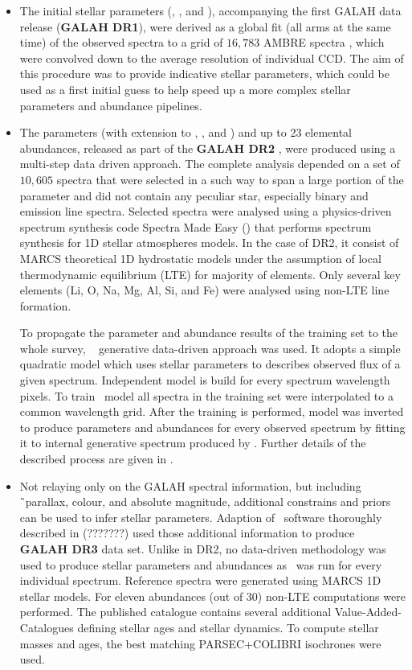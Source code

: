 \begin{itemize}
	\item The initial stellar parameters (\Teff, \Logg, and \Feh), accompanying the first GALAH data release (\textbf{GALAH DR1}), were derived as a global fit (all arms at the same time) of the observed spectra to a grid of $16,783$ AMBRE spectra \citep{2012A&A...544A.126D}, which were convolved down to the average resolution of individual CCD. The aim of this procedure was to provide indicative stellar parameters, which could be used as a first initial guess to help speed up a more complex stellar parameters and abundance pipelines.
	
	\item The parameters (with extension to \vsin, \vmic, and \aks) and up to 23 elemental abundances, released as part of the \textbf{GALAH DR2} \citep{buder2018}, were produced using a multi-step data driven approach. The complete analysis depended on a set of $10,605$ spectra that were selected in a such way to span a large portion of the parameter and did not contain any peculiar star, especially binary and emission line spectra. Selected spectra were analysed using a physics-driven spectrum synthesis code Spectra Made Easy (\SM) \citep{1996A&AS..118..595V, 2017A&A...597A..16P} that performs spectrum synthesis for 1D stellar atmospheres models. In the case of DR2, it consist of MARCS theoretical 1D hydrostatic models \citep{2008A&A...486..951G} under the assumption of local thermodynamic equilibrium (LTE) for majority of elements. Only several key elements (Li, O, Na, Mg, Al, Si, and Fe) were analysed using non-LTE line formation.
	
	To propagate the parameter and abundance results of the training set to the whole survey, \TC\ \citep{2015ApJ...808...16N} generative data-driven approach was used. It adopts a simple quadratic model which uses stellar parameters to describes observed flux of a given spectrum. Independent model is build for every spectrum wavelength pixels. To train \TC\ model all spectra in the training set were interpolated to a common wavelength grid. After the training is performed, model was inverted to produce parameters and abundances for every observed spectrum by fitting it to internal generative spectrum produced by \TC. Further details of the described process are given in \citet{buder2018}.
	
	\item Not relaying only on the GALAH spectral information, but including \G\ parallax, colour, and absolute magnitude, additional constrains and priors can be used to infer stellar parameters. Adaption of \SM\ software thoroughly described in (???????) used those additional information to produce \textbf{GALAH DR3} data set. Unlike in DR2, no data-driven methodology was used to produce stellar parameters and abundances as \SM\ was run for every individual spectrum. Reference spectra were generated using MARCS 1D stellar models. For eleven abundances (out of 30) non-LTE computations were performed. The published catalogue contains several additional Value-Added-Catalogues defining stellar ages and stellar dynamics. To compute stellar masses and ages, the best matching PARSEC+COLIBRI isochrones were used.
	

\end{itemize}
